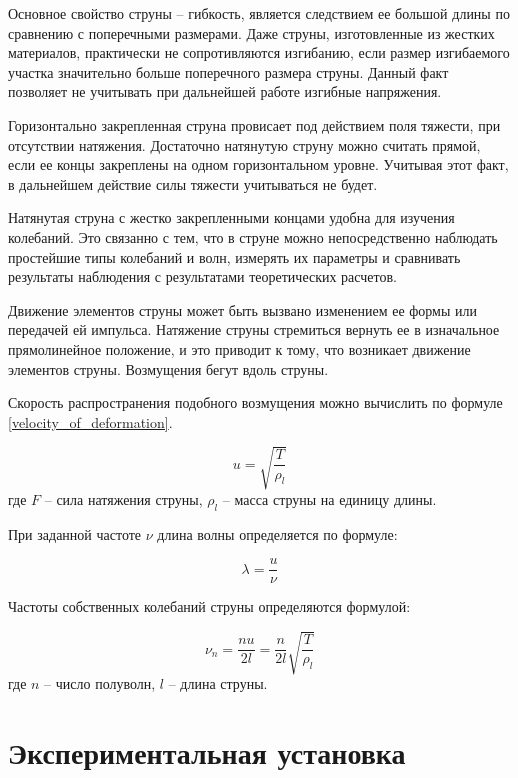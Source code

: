 \documentclass[a4paper,12pt]{article}
\begin{document}
	Основное свойство струны -- гибкость, является следствием ее большой длины по сравнению с поперечными размерами. Даже струны, изготовленные из жестких материалов, практически не сопротивляются изгибанию, если размер изгибаемого участка значительно больше поперечного размера струны. Данный факт позволяет не учитывать при дальнейшей работе изгибные напряжения.
	
	Горизонтально закрепленная струна провисает под действием поля тяжести, при отсутствии натяжения. Достаточно натянутую струну можно считать прямой, если ее концы закреплены на одном горизонтальном уровне. Учитывая этот факт, в дальнейшем действие силы тяжести учитываться не будет.
	
	Натянутая струна с жестко закрепленными концами удобна для изучения колебаний. Это связанно с тем, что в струне можно непосредственно наблюдать простейшие типы колебаний и волн, измерять их параметры и сравнивать результаты наблюдения с результатами теоретических расчетов.
	
	Движение элементов струны может быть вызвано изменением ее формы или передачей ей импульса. Натяжение струны стремиться вернуть ее в изначальное прямолинейное положение, и это приводит к тому, что возникает движение элементов струны. Возмущения бегут вдоль струны.
	
	Скорость распространения подобного возмущения можно вычислить по формуле \eqref{velocity_of_deformation}.
	
	\begin{equation}
		u = \sqrt{\frac{T}{\rho_l}}
		\label{velocity_of_deformation}
	\end{equation}
	где $F$ -- сила натяжения струны, $\rho_{l}$ -- масса струны на единицу длины.
	
	При заданной частоте $\nu$ длина волны определяется по формуле:
	
	\begin{equation}
		\lambda = \frac{u}{\nu}
	\end{equation}
	
	Частоты собственных колебаний струны определяются формулой:
	
	\begin{equation}
		\nu_{n} = \frac{nu}{2l} = \frac{n}{2l}\sqrt{\frac{T}{\rho_l}}
		\label{frequency_velocity_equation}
	\end{equation}
	где $n$ -- число полуволн, $l$ -- длина струны.
	
	\section{Экспериментальная установка}
	
\end{document}
